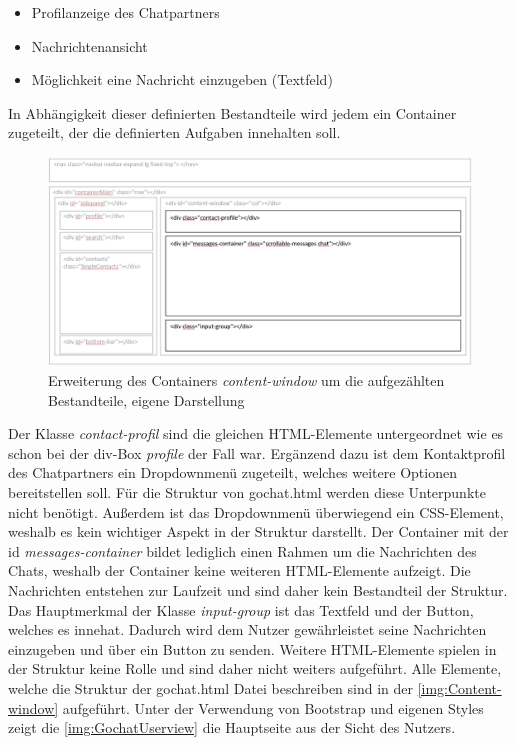 \documentclass[a4paper,titlepage,halfparskip,12pt]{scrreprt}
\begin{document}
\begin{onehalfspacing}
\begin{itemize}
	\item Profilanzeige des Chatpartners
	\item Nachrichtenansicht
	\item Möglichkeit eine Nachricht einzugeben (Textfeld)
\end{itemize}
In Abhängigkeit dieser definierten Bestandteile wird jedem ein Container zugeteilt, der die definierten Aufgaben innehalten soll.
\begin{figure}[h]
	\centering
	\includegraphics[width=\linewidth]{images/BasisStruktur1GochatContentWindow}
	\caption{Erweiterung des Containers \textit{content-window} um die aufgezählten Bestandteile, eigene Darstellung}
	\label{img:Content-window}
\end{figure}
Der Klasse \textit{contact-profil} sind die gleichen HTML-Elemente untergeordnet wie es schon bei der div-Box \textit{profile} der Fall war. Ergänzend dazu ist dem Kontaktprofil des Chatpartners ein Dropdownmenü zugeteilt, welches weitere Optionen bereitstellen soll. Für die Struktur von gochat.html werden diese Unterpunkte nicht benötigt. Außerdem ist das Dropdownmenü überwiegend ein CSS-Element, weshalb es kein wichtiger Aspekt in der Struktur darstellt. Der Container mit der id \textit{messages-container} bildet lediglich einen Rahmen um die Nachrichten des Chats, weshalb der Container keine weiteren HTML-Elemente aufzeigt. Die Nachrichten entstehen zur Laufzeit und sind daher kein Bestandteil der Struktur. Das Hauptmerkmal der Klasse \textit{input-group} ist das Textfeld und der Button, welches es innehat. Dadurch wird dem Nutzer gewährleistet seine Nachrichten einzugeben und über ein Button zu senden. Weitere HTML-Elemente spielen in der Struktur keine Rolle und sind daher nicht weiters aufgeführt. Alle Elemente, welche die Struktur der gochat.html Datei beschreiben sind in der \autoref{img:Content-window} aufgeführt. Unter der Verwendung von Bootstrap und eigenen Styles zeigt die \autoref{img:GochatUserview} die Hauptseite aus der Sicht des Nutzers.

\end{onehalfspacing}
\end{document}

